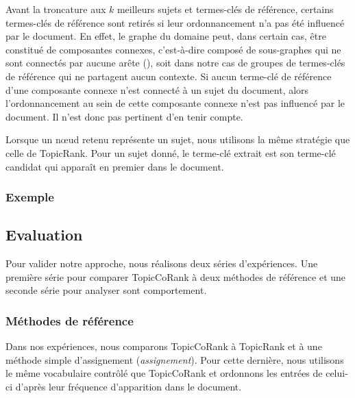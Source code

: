         Avant la troncature aux $k$ meilleurs sujets et termes-clés de
        référence, certains termes-clés de référence sont retirés si leur
        ordonnancement n'a pas été influencé par le document. En effet, le
        graphe du domaine peut, dans certain cas, être constitué de composantes
        connexes, c'est-à-dire composé de sous-graphes qui ne sont connectés par
        aucune arête (), soit dans notre cas de groupes de
        termes-clés de référence qui ne partagent aucun contexte. Si aucun
        terme-clé de référence d'une composante connexe n'est connecté à un
        sujet du document, alors l'ordonnancement au sein de cette composante
        connexe n'est pas influencé par le document. Il n'est donc pas pertinent
        d'en tenir compte.

        Lorsque un n\oe{}ud retenu représente un sujet, nous utilisons la même
        stratégie que celle de TopicRank. Pour un sujet donné, le terme-clé
        extrait est son terme-clé candidat qui apparaît en premier dans le
        document.

      \subsubsection{Exemple}
      \label{subsubsec:main-automatic_keyphrase_annotation-supervised_automatic_keyphrase_extraction-topiccorank-exemple}
        \TODO{\dots}

    \subsection{Evaluation}
    \label{subsec:main-automatic_keyphrase_annotation-supervised_automatic_keyphrase_annotation-evaluation}
      Pour valider notre approche, nous réalisons deux séries d'expériences. Une
      première série pour comparer TopicCoRank à deux méthodes de référence et
      une seconde série pour analyser sont comportement.

      \subsubsection{Méthodes de référence}
      \label{subsubsec:main-automatic_keyphrase_annotation-supervised_automatic_keyphrase_annotation-evaluation-baselines}
        Dans nos expériences, nous comparons TopicCoRank à TopicRank et à
        une méthode simple d'assignement (\textit{assignement}). Pour cette
        dernière, nous utilisons le même vocabulaire contrôlé que TopicCoRank et
        ordonnons les entrées de celui-ci d'après leur fréquence d'apparition
        dans le document. 

